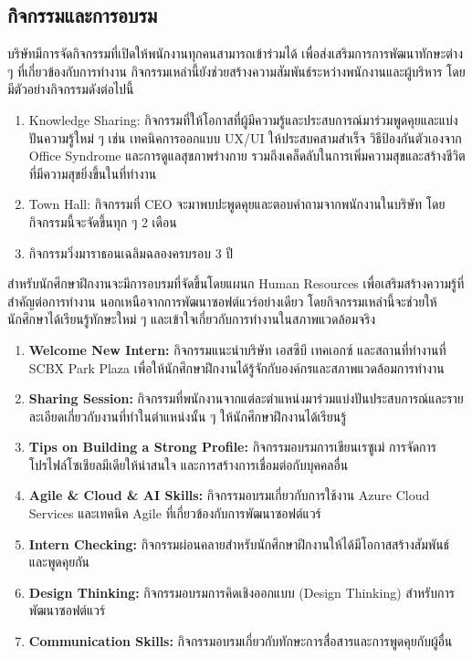 \subsection{กิจกรรมและการอบรม}
บริษัทมีการจัดกิจกรรมที่เปิดให้พนักงานทุกคนสามารถเข้าร่วมได้ เพื่อส่งเสริมการการพัฒนาทักษะต่าง ๆ ที่เกี่ยวข้องกับการทำงาน กิจกรรมเหล่านี้ยังช่วยสร้างความสัมพันธ์ระหว่างพนักงานและผู้บริหาร โดยมีตัวอย่างกิจกรรมดังต่อไปนี้
\begin{enumerate}
    \item Knowledge Sharing: กิจกรรมที่ให้โอกาสที่ผู้มีความรู้และประสบการณ์มาร่วมพูดคุยและแบ่งปันความรู้ใหม่ ๆ เช่น เทคนิคการออกแบบ UX/UI ให้ประสบคสามสำเร็จ วิธีป้องกันตัวเองจาก Office Syndrome และการดูแลสุขภาพร่างกาย รวมถึงเคล็ดลับในการเพิ่มความสุขและสร้างชีวิตที่มีความสุขยิ่งขึ้นในที่ทำงาน
    \item Town Hall: กิจกรรมที่ CEO จะมาพบปะพูดคุยและตอบคำถามจากพนักงานในบริษัท โดยกิจกรรมนี้จะจัดขึ้นทุก ๆ 2 เดือน
    \item กิจกรรมวิ่งมาราธอนเฉลิมฉลองครบรอบ 3 ปี
\end{enumerate}
สำหรับนักศึกษาฝึกงานจะมีการอบรมที่จัดขึ้นโดยแผนก Human Resources เพื่อเสริมสร้างความรู้ที่สำคัญต่อการทำงาน นอกเหนือจากการพัฒนาซอฟต์แวร์อย่างเดียว โดยกิจกรรมเหล่านี้จะช่วยให้นักศึกษาได้เรียนรู้ทักษะใหม่ ๆ และเข้าใจเกี่ยวกับการทำงานในสภาพแวดล้อมจริง
\begin{enumerate}
    \item \textbf{Welcome New Intern: }กิจกรรมแนะนำบริษัท เอสซีบี เทคเอกซ์ และสถานที่ทำงานที่ SCBX Park Plaza เพื่อให้นักศึกษาฝึกงานได้รู้จักกับองค์กรและสภาพแวดล้อมการทำงาน

    \item \textbf{Sharing Session: }กิจกรรมที่พนักงานจากแต่ละตำแหน่งมาร่วมแบ่งปันประสบการณ์และรายละเอียดเกี่ยวกับงานที่ทำในตำแหน่งนั้น ๆ ให้นักศึกษาฝึกงานได้เรียนรู้
    
    \item \textbf{Tips on Building a Strong Profile: }กิจกรรมอบรมการเขียนเรซูเม่ การจัดการโปรไฟล์โซเชียลมีเดียให้น่าสนใจ และการสร้างการเชื่อมต่อกับบุคคลอื่น
    
    \item \textbf{Agile \& Cloud \& AI Skills: }กิจกรรมอบรมเกี่ยวกับการใช้งาน Azure Cloud Services และเทคนิค Agile ที่เกี่ยวข้องกับการพัฒนาซอฟต์แวร์
    
    \item \textbf{Intern Checking: }กิจกรรมผ่อนคลายสำหรับนักศึกษาฝึกงานให้ได้มีโอกาสสร้างสัมพันธ์และพูดคุยกัน
    
    \item \textbf{Design Thinking: }กิจกรรมอบรมการคิดเชิงออกแบบ (Design Thinking) สำหรับการพัฒนาซอฟต์แวร์
    
    \item \textbf{Communication Skills: }กิจกรรมอบรมเกี่ยวกับทักษะการสื่อสารและการพูดคุยกับผู้อื่น
    
\end{enumerate}

